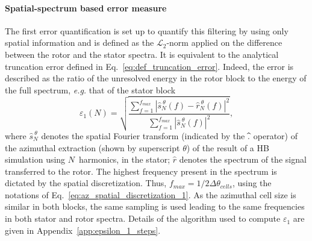 \paragraph{Spatial-spectrum based error measure}
\label{sec:crit_1}

The first error quantification is set up to quantify this filtering 
by using only spatial information and is defined as the $\mathcal{L}_2$-norm 
applied on the 
difference between the rotor and the stator spectra.
It is equivalent to the analytical truncation error 
defined in Eq.~\eqref{eq:def_truncation_error}. 
Indeed, the error is described as the ratio of the unresolved energy 
in the rotor block
to the energy of the full spectrum, 
\emph{e.g.} that of the stator block
\begin{equation}
    \varepsilon_1(N) = \sqrt{
    \frac{\sum_{f=1}^{f_{max}} | \widehat{s}^{~\theta}_N (f) - 
      \widehat{r}^{~\theta}_N (f)|^2}{ 
    \sum_{f=1}^{f_{max}} | \widehat{s}^{~\theta}_N (f)|^2}},
    \label{eq:def_crit_1}
\end{equation} 
where $\widehat{s}^{~\theta}_N$ denotes the spatial Fourier transform (indicated by
the $\widehat{\vphantom{s}.}$ operator) of the azimuthal extraction (shown
by superscript $\theta$) of the result of a HB simulation using $N$~harmonics,
in the stator; $\widehat{r}$ denotes the spectrum of 
the signal transferred to the rotor.
The highest frequency present in the spectrum is dictated 
by the spatial discretization. Thus, $f_{max} = 1 / 2\Delta \theta_{cells}$, 
using the notations of Eq.~\eqref{eq:az_spatial_discretization_1}.
As the azimuthal cell size is similar in both blocks, 
the same sampling is used leading to the same 
frequencies in both stator and rotor spectra.
Details of the algorithm used to compute $\varepsilon_1$ 
are given in Appendix~\ref{app:epsilon_1_steps}.

